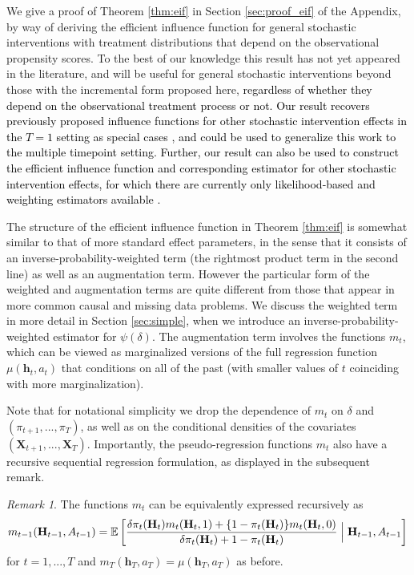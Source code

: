 \documentclass[12pt]{article}
\newcommand{\E}{\mathbb{E}}
\newcommand{\bX}{\mathbf{X}}
\newcommand{\bH}{\mathbf{H}}
\newcommand{\bh}{\mathbf{h}}
\theoremstyle{remark}
\newtheorem{remark}{Remark}
\begin{document}
We give a proof of Theorem \ref{thm:eif} in Section \ref{sec:proof_eif} of the Appendix, by way of deriving the efficient influence function for general stochastic interventions with treatment distributions that depend on the observational propensity scores. To the best of our knowledge this result has not yet appeared in the literature, and will be useful for general stochastic interventions beyond those with the incremental form proposed here, \textcolor{black}{regardless of whether they depend on the observational treatment process or not. Our result recovers previously proposed influence functions for other stochastic intervention effects in the $T=1$ setting as special cases \autocite{diaz2012population, haneuse2013estimation},  and could be used to generalize this work to the multiple timepoint setting. Further, our result can also be used to construct the efficient influence function and corresponding estimator for other stochastic intervention effects, for which there are currently only likelihood-based and weighting estimators available \autocite{moore2012causal,young2014identification}.} 

The structure of the efficient influence function in Theorem \ref{thm:eif} is somewhat similar to that of more standard effect parameters, in the sense that it consists of an inverse-probability-weighted term (the rightmost product term in the second line) as well as an augmentation term. However the particular form of the weighted and augmentation terms are quite different from those that appear in more common causal and missing data problems. We discuss the weighted term in more detail in Section \ref{sec:simple}, when we introduce an inverse-probability-weighted estimator for $\psi(\delta)$. The augmentation term involves the functions $m_t$, which  can be viewed as marginalized versions of the full regression function $\mu(\bh_t,a_t)$ that conditions on all of the past (with smaller values of $t$ coinciding with more marginalization). 

Note that for notational simplicity we drop the dependence of $m_t$ on $\delta$ and $(\pi_{t+1},...,\pi_T)$, as well as on the conditional densities of the covariates $(\bX_{t+1},...,\bX_T)$. Importantly, the pseudo-regression functions $m_t$ also have a recursive sequential regression formulation, as displayed in the subsequent remark. 

\begin{remark}
The functions $m_t$ can be equivalently expressed recursively as
$$ m_{t-1}(\bH_{t-1},A_{t-1}) = \E\left[  \frac{ \delta \pi_{t}(\bH_{t}) m_{t}(\bH_{t},1) + \{1-\pi_{t}(\bH_{t})\} m_{t}(\bH_{t},0) }{ \delta \pi_{t}(\bH_{t}) + 1- \pi_{t}(\bH_{t}) } \Bigm| \bH_{t-1}, A_{t-1} \right] $$
for  $t=1,...,T$ and $m_T(\bh_T,a_T)=\mu(\bh_T,a_T)$ as before.
\end{remark}
\end{document}
